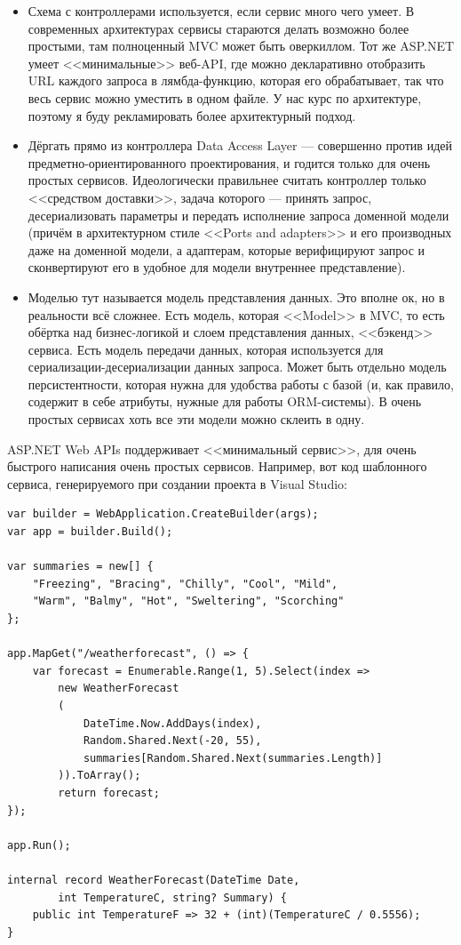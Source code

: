 \documentclass{../../text-style}
\begin{document}
\begin{itemize}
    \item Схема с контроллерами используется, если сервис много чего умеет. В современных архитектурах сервисы стараются делать возможно более простыми, там полноценный MVC может быть оверкиллом. Тот же ASP.NET умеет <<минимальные>> веб-API, где можно декларативно отобразить URL каждого запроса в лямбда-функцию, которая его обрабатывает, так что весь сервис можно уместить в одном файле. У нас курс по архитектуре, поэтому я буду рекламировать более архитектурный подход.
    \item Дёргать прямо из контроллера Data Access Layer --- совершенно против идей предметно-ориентированного проектирования, и годится только для очень простых сервисов. Идеологически правильнее считать контроллер только <<средством доставки>>, задача которого --- принять запрос, десериализовать параметры и передать исполнение запроса доменной модели (причём в архитектурном стиле <<Ports and adapters>> и его производных даже на доменной модели, а адаптерам, которые верифицируют запрос и сконвертируют его в удобное для модели внутреннее представление).
    \item Моделью тут называется модель представления данных. Это вполне ок, но в реальности всё сложнее. Есть модель, которая <<Model>> в MVC, то есть обёртка над бизнес-логикой и слоем представления данных, <<бэкенд>> сервиса. Есть модель передачи данных, которая используется для сериализации-десериализации данных запроса. Может быть отдельно модель персистентности, которая нужна для удобства работы с базой (и, как правило, содержит в себе атрибуты, нужные для работы ORM-системы). В очень простых сервисах хоть все эти модели можно склеить в одну.
\end{itemize}

ASP.NET Web APIs поддерживает <<минимальный сервис>>, для очень быстрого написания очень простых сервисов. Например, вот код шаблонного сервиса, генерируемого при создании проекта в Visual Studio:

\begin{footnotesize}
    \begin{verbatim}
var builder = WebApplication.CreateBuilder(args);
var app = builder.Build();

var summaries = new[] {
    "Freezing", "Bracing", "Chilly", "Cool", "Mild", 
    "Warm", "Balmy", "Hot", "Sweltering", "Scorching"
};

app.MapGet("/weatherforecast", () => {
    var forecast = Enumerable.Range(1, 5).Select(index =>
        new WeatherForecast
        (
            DateTime.Now.AddDays(index),
            Random.Shared.Next(-20, 55),
            summaries[Random.Shared.Next(summaries.Length)]
        )).ToArray();
        return forecast;
});

app.Run();

internal record WeatherForecast(DateTime Date, 
        int TemperatureC, string? Summary) {
    public int TemperatureF => 32 + (int)(TemperatureC / 0.5556);
}
    \end{verbatim}
\end{footnotesize}
\end{document}
